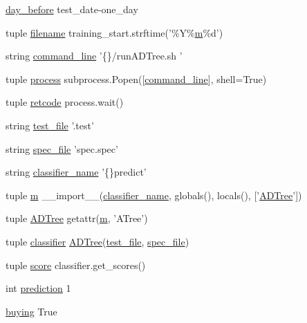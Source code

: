\begin{DoxyCompactItemize}
\item 
\hyperlink{namespacemain_a13bddefadc5986a6f749db9e47271727}{day\-\_\-before} test\-\_\-date-\/one\-\_\-day
\item 
tuple \hyperlink{namespacemain_a50e2bb2c2453d804e5d6b3a5b74c1cf1}{filename} training\-\_\-start.\-strftime('\%Y\%\hyperlink{namespacemain_adbc6b6d451e5853c258a6713144bae5a}{m}\%d')
\item 
string \hyperlink{namespacemain_aafb9018fe880bf4127e57a72c103563b}{command\-\_\-line} '\{\}/run\-A\-D\-Tree.\-sh '
\item 
tuple \hyperlink{namespacemain_a1fafe44ec9b6c9b2b579106b6515eb1e}{process} subprocess.\-Popen(\mbox{[}\hyperlink{namespacemain_aafb9018fe880bf4127e57a72c103563b}{command\-\_\-line}\mbox{]}, shell=True)
\item 
tuple \hyperlink{namespacemain_ae992f00b1fb1709567ce49dfc1e91993}{retcode} process.\-wait()
\item 
string \hyperlink{namespacemain_ab2ce12225f499c96566bee050694f576}{test\-\_\-file} '.test'
\item 
string \hyperlink{namespacemain_addc9c6a1eb509aa124df4c1fa66cf891}{spec\-\_\-file} 'spec.\-spec'
\item 
string \hyperlink{namespacemain_ab4ac9dda3d2fa82f888de091614f6090}{classifier\-\_\-name} '\{\}predict'
\item 
tuple \hyperlink{namespacemain_adbc6b6d451e5853c258a6713144bae5a}{m} \-\_\-\-\_\-import\-\_\-\-\_\-(\hyperlink{namespacemain_ab4ac9dda3d2fa82f888de091614f6090}{classifier\-\_\-name}, globals(), locals(), \mbox{[}'\hyperlink{namespacemain_a850e5686e3d530b318c9f2b73c5929f3}{A\-D\-Tree}'\mbox{]})
\item 
tuple \hyperlink{namespacemain_a850e5686e3d530b318c9f2b73c5929f3}{A\-D\-Tree} getattr(\hyperlink{namespacemain_adbc6b6d451e5853c258a6713144bae5a}{m}, 'A\-Tree')
\item 
tuple \hyperlink{namespacemain_a07830f194ffad5f009530ec549a93b5f}{classifier} \hyperlink{namespacemain_a850e5686e3d530b318c9f2b73c5929f3}{A\-D\-Tree}(\hyperlink{namespacemain_ab2ce12225f499c96566bee050694f576}{test\-\_\-file}, \hyperlink{namespacemain_addc9c6a1eb509aa124df4c1fa66cf891}{spec\-\_\-file})
\item 
tuple \hyperlink{namespacemain_a52dcd672d21ad23f8d3db387b1b17983}{score} classifier.\-get\-\_\-scores()
\item 
int \hyperlink{namespacemain_a3d86c9a974d908ad52608b11f24df15d}{prediction} 1
\item 
\hyperlink{namespacemain_ace774159e8fcc00c1958a240079dd5e2}{buying} True

\end{DoxyCompactItemize}
